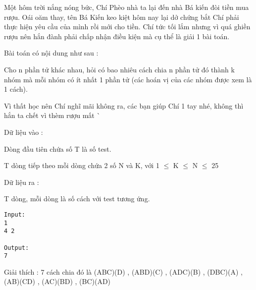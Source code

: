 



   Một hôm trời nắng nóng bức, Chí Phèo nhà ta lại đến nhà Bá kiến đòi tiền mua rượu. Oái oăm thay, tên Bá Kiến keo kiệt hôm nay lại dở chứng bắt Chí phải thực hiện yêu cầu của mình rồi mới cho tiền. Chí tức tối lắm nhưng vì quá ghiền rượu nên hắn đành phải chấp nhận điều kiện mà cụ thể là giải 1 bài toán.  

   Bài toán có nội dung như sau :   


   Cho n phần tử khác nhau, hỏi có bao nhiêu cách chia n phần tử đó thành k nhóm mà mỗi nhóm có ít nhất 1 phần tử (các hoán vị của các nhóm được xem là 1 cách).  

   Vì thất học nên Chí nghĩ mãi không ra, các bạn giúp Chí 1 tay nhé, không thì hắn ta chết vì thèm rượu mất ^^  

       Dữ liệu vào :      


   Dòng đầu tiên chứa số T là số test.   


   T dòng tiếp theo mỗi dòng chứa 2 số N và K, với 1 $\le$ K $\le$ N $\le$ 25   


       Dữ liệu ra :      


   T dòng, mỗi dòng là số cách với test tương ứng.  
\begin{verbatim}
Input:
1
4 2

Output:
7
\end{verbatim}

   Giải thích : 7 cách chia đó là (ABC)(D) , (ABD)(C) , (ADC)(B) , (DBC)(A) , (AB)(CD) , (AC)(BD) , (BC)(AD)  

